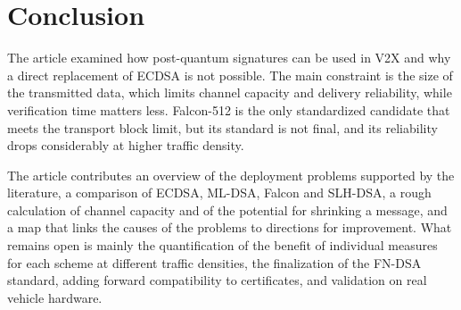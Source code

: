 \documentclass[10pt,twoside,a4paper]{article}
\begin{document}
\section{Conclusion} \label{zaver}

The article examined how post-quantum signatures can be used in V2X and why a direct replacement of ECDSA is not possible. The main constraint is the size of the transmitted data, which limits channel capacity and delivery reliability, while verification time matters less. Falcon-512 is the only standardized candidate that meets the transport block limit, but its standard is not final, and its reliability drops considerably at higher traffic density.

The article contributes an overview of the deployment problems supported by the literature, a comparison of ECDSA, ML-DSA, Falcon and SLH-DSA, a rough calculation of channel capacity and of the potential for shrinking a message, and a map that links the causes of the problems to directions for improvement. What remains open is mainly the quantification of the benefit of individual measures for each scheme at different traffic densities, the finalization of the FN-DSA standard, adding forward compatibility to certificates, and validation on real vehicle hardware.



\end{document}
